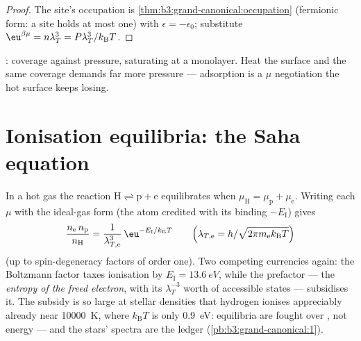 \begin{proof}
The site's occupation is
\cref{thm:b3:grand-canonical:occupation} (fermionic form: a site
holds at most one) with $\epsilon = -\epsilon_0$; substitute
$\eu^{\beta\mu} = n\lambda_T^3 = P\lambda_T^3/k_{\text{B}}T$.
\end{proof}

\begin{omfigure}

{\small {}: coverage against pressure, saturating
at a monolayer. Heat the surface and the same coverage demands far
more pressure --- adsorption is a $\mu$ negotiation the hot surface
keeps losing.}
\end{omfigure}

\section{Ionisation equilibria: the Saha equation}

\begin{proposition}\label{prop:b3:grand-canonical:saha}
In a hot gas the reaction $\text{H} \rightleftharpoons \text{p} +
\text{e}$ equilibrates when $\mu_{\text{H}} = \mu_{\text{p}} +
\mu_{\text{e}}$. Writing each $\mu$ with the ideal-gas form (the
atom credited with its binding $-E_{\text{I}}$) gives
\[
\frac{n_{\text{e}}\,n_{\text{p}}}{n_{\text{H}}}
 = \frac{1}{\lambda_{T,\text{e}}^3}\,
\eu^{-E_{\text{I}}/k_{\text{B}}T}
\qquad\Big(\lambda_{T,\text{e}} =
h/\sqrt{2\pi m_{\text{e}}k_{\text{B}}T}\Big)
\]
(up to spin-degeneracy factors of order one). Two competing
currencies again: the Boltzmann factor taxes ionisation by
$E_{\text{I}} = \qty{13.6}{eV}$, while the prefactor --- the
\emph{entropy of the freed electron}, with its $\lambda_T^{-3}$
worth of accessible states --- subsidises it. The subsidy is so
large at stellar densities that hydrogen ionises appreciably
already near \qty{10000}{K}, where $k_{\text{B}}T$ is only
\qty{0.9}{eV}: equilibria are fought over , not energy
--- and the stars' spectra are the ledger
(\cref{pb:b3:grand-canonical:1}).
\end{proposition}

